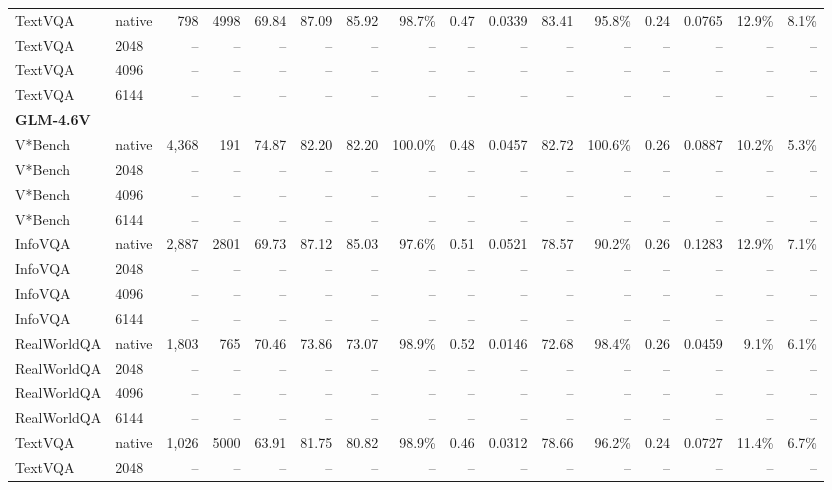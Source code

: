 \begin{table}[t]
\begin{tabular}{llrrrrrrrrrrrrrr}
TextVQA & native & 798 & 4998 & 69.84 & 87.09 & 85.92 & 98.7\% & 0.47 & 0.0339 & 83.41 & 95.8\% & 0.24 & 0.0765 & 12.9\% & 8.1\% \\
TextVQA & 2048 & -- & -- & -- & -- & -- & -- & -- & -- & -- & -- & -- & -- & -- & -- \\
TextVQA & 4096 & -- & -- & -- & -- & -- & -- & -- & -- & -- & -- & -- & -- & -- & -- \\
TextVQA & 6144 & -- & -- & -- & -- & -- & -- & -- & -- & -- & -- & -- & -- & -- & -- \\
\midrule
\multicolumn{10}{l}{\textbf{GLM-4.6V}} \\
V*Bench & native & 4,368 & 191 & 74.87 & 82.20 & 82.20 & 100.0\% & 0.48 & 0.0457 & 82.72 & 100.6\% & 0.26 & 0.0887 & 10.2\% & 5.3\% \\
V*Bench & 2048 & -- & -- & -- & -- & -- & -- & -- & -- & -- & -- & -- & -- & -- & -- \\
V*Bench & 4096 & -- & -- & -- & -- & -- & -- & -- & -- & -- & -- & -- & -- & -- & -- \\
V*Bench & 6144 & -- & -- & -- & -- & -- & -- & -- & -- & -- & -- & -- & -- & -- & -- \\
InfoVQA & native & 2,887 & 2801 & 69.73 & 87.12 & 85.03 & 97.6\% & 0.51 & 0.0521 & 78.57 & 90.2\% & 0.26 & 0.1283 & 12.9\% & 7.1\% \\
InfoVQA & 2048 & -- & -- & -- & -- & -- & -- & -- & -- & -- & -- & -- & -- & -- & -- \\
InfoVQA & 4096 & -- & -- & -- & -- & -- & -- & -- & -- & -- & -- & -- & -- & -- & -- \\
InfoVQA & 6144 & -- & -- & -- & -- & -- & -- & -- & -- & -- & -- & -- & -- & -- & -- \\
RealWorldQA & native & 1,803 & 765 & 70.46 & 73.86 & 73.07 & 98.9\% & 0.52 & 0.0146 & 72.68 & 98.4\% & 0.26 & 0.0459 & 9.1\% & 6.1\% \\
RealWorldQA & 2048 & -- & -- & -- & -- & -- & -- & -- & -- & -- & -- & -- & -- & -- & -- \\
RealWorldQA & 4096 & -- & -- & -- & -- & -- & -- & -- & -- & -- & -- & -- & -- & -- & -- \\
RealWorldQA & 6144 & -- & -- & -- & -- & -- & -- & -- & -- & -- & -- & -- & -- & -- & -- \\
TextVQA & native & 1,026 & 5000 & 63.91 & 81.75 & 80.82 & 98.9\% & 0.46 & 0.0312 & 78.66 & 96.2\% & 0.24 & 0.0727 & 11.4\% & 6.7\% \\
TextVQA & 2048 & -- & -- & -- & -- & -- & -- & -- & -- & -- & -- & -- & -- & -- & -- \\

\end{tabular}
\end{table}
